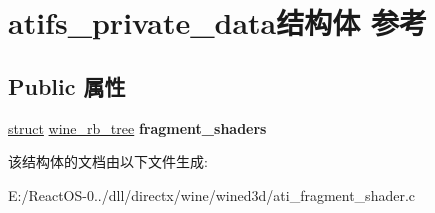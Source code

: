 \hypertarget{structatifs__private__data}{}\section{atifs\+\_\+private\+\_\+data结构体 参考}
\label{structatifs__private__data}
\subsection*{Public 属性}
\begin{DoxyCompactItemize}
\item 
\mbox{\label{structatifs__private__data_a7063697b6f96d3bcb744a662419543bf}} 
\hyperlink{interfacestruct}{struct} \hyperlink{structwine__rb__tree}{wine\+\_\+rb\+\_\+tree} {\bfseries fragment\+\_\+shaders}
\end{DoxyCompactItemize}


该结构体的文档由以下文件生成\+:\begin{DoxyCompactItemize}
\item 
E\+:/\+React\+O\+S-\/0../dll/directx/wine/wined3d/ati\+\_\+fragment\+\_\+shader.\+c\end{DoxyCompactItemize}
